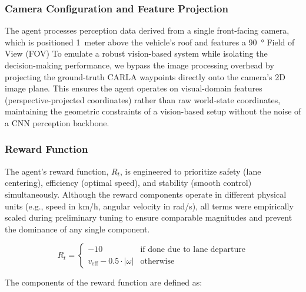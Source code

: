 \documentclass[]{interact}
\begin{document}
\subsubsection{Camera Configuration and Feature Projection}
The agent processes perception data derived from a single front-facing camera, which is positioned \SI{1}{meter} above the vehicle's roof and features a \SI{90}{\degree} Field of View (FOV)
To emulate a robust vision-based system while isolating the decision-making performance, we bypass the image processing overhead by projecting the ground-truth CARLA waypoints directly onto the camera's 2D image plane.
This ensures the agent operates on visual-domain features (perspective-projected coordinates) rather than raw world-state coordinates, maintaining the geometric constraints of a vision-based setup without the noise of a CNN perception backbone.

\subsubsection{Reward Function}
The agent's reward function, $R_t$, is engineered to prioritize safety (lane centering), efficiency (optimal speed), and stability (smooth control) simultaneously.
Although the reward components operate in different physical units (e.g., speed in km/h, angular velocity in rad/s), all terms were empirically scaled during preliminary tuning to ensure comparable magnitudes and prevent the dominance of any single component.

$$
\label{eq:reward}
 R_t = \begin{cases}
-10 & \text{if done due to lane departure}
\\v_{\mathrm{eff}} - 0.5 \cdot |\omega|
& \text{otherwise}
\end{cases}
$$

The components of the reward function are defined as:
\end{document}
